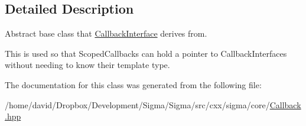 \subsection{Detailed Description}
Abstract base class that \hyperlink{classsigma_1_1core_1_1_callback_interface}{Callback\-Interface} derives from. 

This is used so that Scoped\-Callbacks can hold a pointer to Callback\-Interfaces without needing to know their template type. 

The documentation for this class was generated from the following file\-:\begin{DoxyCompactItemize}
\item 
/home/david/\-Dropbox/\-Development/\-Sigma/\-Sigma/src/cxx/sigma/core/\hyperlink{_callback_8hpp}{Callback.\-hpp}\end{DoxyCompactItemize}
